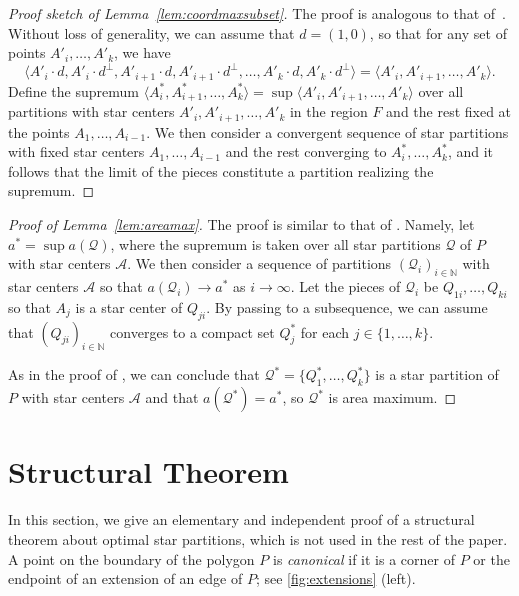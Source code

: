 \documentclass{theoretics}
\newcommand{\NN}{\mathbb{N}}
\begin{document}
\begin{proof}[Proof sketch of Lemma~\ref{lem:coordmaxsubset}]
The proof is analogous to that of~.
Without loss of generality, we can assume that $d=(1,0)$, so that for any set of points $A'_i,\ldots,A'_k$, we have
\[\langle A'_i\cdot d, A'_i\cdot d^\perp,A'_{i+1}\cdot d, A'_{i+1}\cdot d^\perp,\ldots,A'_k\cdot d,A'_k\cdot d^\perp\rangle=\langle A'_i,A'_{i+1},\ldots,A'_k\rangle.\]
Define the supremum $\langle A^*_i,A^*_{i+1},\ldots,A^*_k\rangle=\sup \langle A'_i,A'_{i+1},\ldots,A'_k\rangle$ over all partitions with star centers $A'_i,A'_{i+1},\ldots,A'_k$ in the region $F$ and the rest fixed at the points $A_1,\ldots,A_{i-1}$.
We then consider a convergent sequence of star partitions with fixed star centers $A_1,\ldots,A_{i-1}$ and the rest converging to $A^*_i,\ldots,A^*_k$, and it follows that the limit of the pieces constitute a partition realizing the supremum.
\end{proof}

\begin{proof}[Proof of Lemma~\ref{lem:areamax}]
The proof is similar to that of .
Namely, let $a^*=\sup a(\mathcal Q)$, where the supremum is taken over all star partitions $\mathcal Q$ of $P$ with star centers $\mathcal A$.
We then consider a sequence of partitions $(\mathcal Q_i)_{i\in\NN}$ with star centers $\mathcal A$ so that $a(\mathcal Q_i)\longrightarrow a^*$ as $i\longrightarrow\infty$.
Let the pieces of $\mathcal Q_i$ be $Q_{1i},\ldots,Q_{ki}$ so that $A_j$ is a star center of $Q_{ji}$.
By passing to a subsequence, we can assume that $(Q_{ji})_{i\in\NN}$ converges to a compact set $Q_j^*$ for each $j\in\{1,\ldots,k\}$.

As in the proof of , we can conclude that $\mathcal Q^*=\{Q_1^*,\ldots,Q_k^*\}$ is a star partition of $P$ with star centers $\mathcal A$ and that $a(\mathcal Q^*)=a^*$, so $\mathcal Q^*$ is area maximum.
\end{proof}

\section{Structural Theorem}
\label{app:struct}

In this section, we give an elementary and independent proof of a structural theorem about optimal star partitions, which is not used in the rest of the paper.
A point on the boundary of the polygon $P$ is \emph{canonical} if it is a corner of $P$ or the endpoint of an extension of an edge of $P$; see \cref{fig:extensions} (left).
\end{document}
